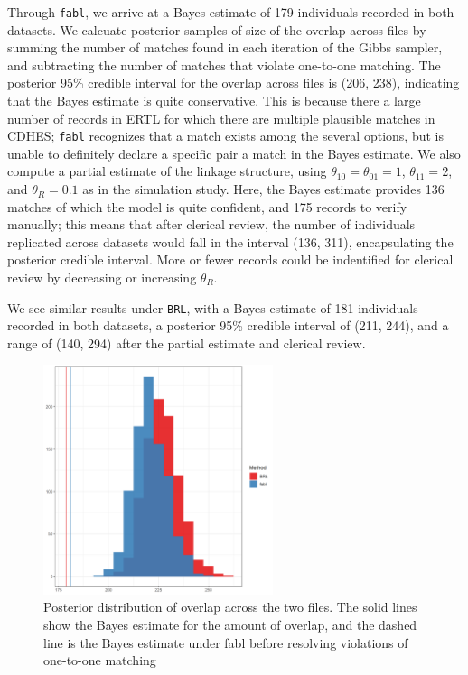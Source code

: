 \documentclass[12pt,letterpaper]{article}
\newcommand{\1}[1]{\mathbb{I}\!\left[#1\right]} %
\begin{document}
{
\color{blue}
Through \texttt{fabl}, we arrive at a Bayes estimate of 179 individuals recorded in both datasets. We calcuate posterior samples of size of the overlap across files by summing the number of matches found in each iteration of the Gibbs sampler, and subtracting the number of matches that violate one-to-one matching. The posterior 95\% credible interval for the overlap across files is (206, 238), indicating that the Bayes estimate is quite conservative. This is because there a large number of records in ERTL for which there are multiple plausible matches in CDHES; \texttt{fabl} recognizes that a match exists among the several options, but is unable to definitely declare a specific pair a match in the Bayes estimate. We also compute a partial estimate of the linkage structure, using $\theta_{10} = \theta_{01} = 1$, $\theta_{11} = 2$, and $\theta_R = 0.1$ as in the simulation study. Here, the Bayes estimate provides 136 matches of which the model is quite confident, and 175 records to verify manually; this means that after clerical review, the number of individuals replicated across datasets would fall in the interval (136, 311), encapsulating the posterior credible interval. More or fewer records could be indentified for clerical review by decreasing or increasing $\theta_R$. 

We see similar results under \texttt{BRL}, with a Bayes estimate of 181 individuals recorded in both datasets, a posterior 95\% credible interval of (211, 244), and a range of (140, 294) after the partial estimate and clerical review. 
}

\begin{figure}[h!]
	\begin{center}
		\includegraphics[width=0.6\textwidth]{../notes/figures/el_salvador/overlap_distribution_smallP_bayes} 
		\caption{Posterior distribution of overlap across the two files. The solid lines show the Bayes estimate for the amount of overlap, and the dashed line is the Bayes estimate under fabl before resolving violations of one-to-one matching}
		\label{fig:overlap-plot}
	\end{center}
\end{figure}
\end{document}
